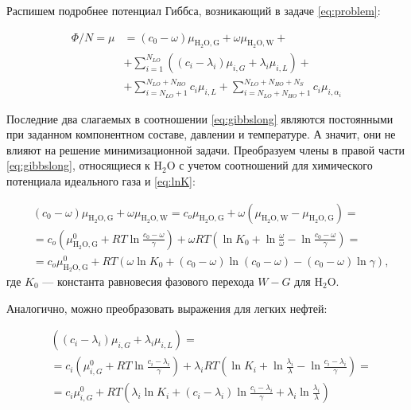 \documentclass[12pt]{article}
\begin{document}
Распишем подробнее потенциал Гиббса, возникающий в задаче \eqref{eq:problem}:

\begin{equation}
\begin{aligned}
\Phi / N = \mu &= (c_0 - \omega) \mu_{\mathrm{H_2O, G}} + \omega \mu_{\mathrm{H_2O, W}} + \\
& + \sum_{i = 1}^{N_{LO}} \left((c_i - \lambda_i) \mu_{i, G} + \lambda_i \mu_{i, L}\right) + \\
& + \sum_{i = N_{LO} + 1}^{N_{LO} + N_{HO}} c_i \mu_{i, L} + \sum_{i = N_{LO} + N_{HO}+ 1}^{N_{LO} + N_{HO} + N_{S}} c_i \mu_{i, \alpha_i}
\end{aligned}
\label{eq:gibbslong}
\end{equation}

Последние два слагаемых в соотношении \eqref{eq:gibbslong} являются постоянными при заданном компонентном составе, давлении и температуре. А значит, они не влияют на решение минимизационной задачи. Преобразуем члены в правой части \eqref{eq:gibbslong}, относящиеся к $\mathrm{H_2O}$ с учетом соотношений для химического потенциала идеального газа и \eqref{eq:lnK}:

\begin{equation}
\begin{aligned}
& (c_0 - \omega) \mu_{\mathrm{H_2O, G}} + \omega \mu_{\mathrm{H_2O, W}} = c_o \mu_{\mathrm{H_2O, G}} + \omega (\mu_{\mathrm{H_2O, W}} - \mu_{\mathrm{H_2O, G}}) = \\
& = c_o \left(\mu_{\mathrm{H_2O, G}}^{0} + RT \ln \frac{c_0 - \omega}{\gamma}\right) + \omega RT \left(\ln K_0 + \ln \frac{\omega}{\omega} - \ln \frac{c_0 - \omega}{\gamma}\right) = \\
& = c_o \mu_{\mathrm{H_2O, G}}^{0} + RT \left(\omega \ln K_0 + (c_0 - \omega) \ln (c_0 - \omega) - (c_0 - \omega) \ln \gamma\right),
\end{aligned}
\label{eq:gibbswater}
\end{equation}
где $K_0$ --- константа равновесия фазового перехода $W-G$ для $\mathrm{H_2O}$.

Аналогично, можно преобразовать выражения для легких нефтей:

\begin{equation}
\begin{aligned}
& \left((c_i - \lambda_i) \mu_{i, G} + \lambda_i \mu_{i, L}\right) = \\
& = c_i \left(\mu_{i, G}^0 + RT \ln \frac{c_i - \lambda_i}{\gamma} \right) + \lambda_i RT \left(\ln K_i + \ln \frac{\lambda_i}{\lambda} - \ln \frac{c_i - \lambda_i}{\gamma}\right) = \\
& = c_i \mu_{i, G}^0 + RT \left(\lambda_i \ln K_i + (c_i - \lambda_i)\ln \frac{c_i - \lambda_i}{\gamma} + \lambda_i \ln \frac{\lambda_i}{\lambda} \right)
\end{aligned}
\label{eq:gibbsliquid}
\end{equation}
\end{document}
